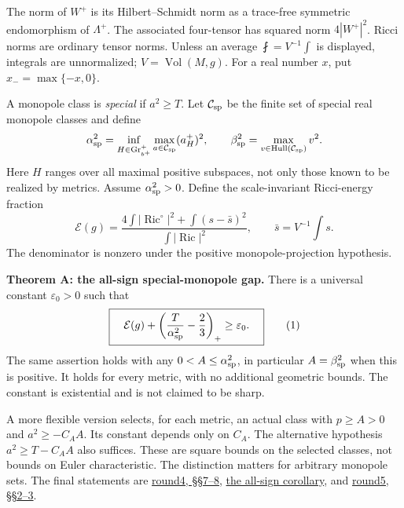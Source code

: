 \documentclass[
  english,
]{article}
\begin{document}
The norm of \(W^+\) is its Hilbert--Schmidt norm as a trace-free
symmetric endomorphism of \(\Lambda^+\). The associated four-tensor has
squared norm \(4|W^+|^2\). Ricci norms are ordinary tensor norms. Unless
an average \(\fint=V^{-1}\int\) is displayed, integrals are
unnormalized; \(V=\operatorname{Vol}(M,g)\). For a real number \(x\),
put \(x_-=\max\{-x,0\}\).

A monopole class is \emph{special} if \(a^2\ge T\). Let
\(\mathcal C_{\rm sp}\) be the finite set of special real monopole
classes and define \[
 \alpha_{\rm sp}^2=
 \inf_{H\in{\rm Gr}_{b^+}^{+}}
       \max_{a\in\mathcal C_{\rm sp}}(a_H^+)^2,\qquad
 \beta_{\rm sp}^2=
 \max_{v\in{\rm Hull}(\mathcal C_{\rm sp})}v^2 .
\] Here \(H\) ranges over all maximal positive subspaces, not only those
known to be realized by metrics. Assume \(\alpha_{\rm sp}^2>0\). Define
the scale-invariant Ricci-energy fraction \[
 \mathcal E(g)=
 \frac{4\int|\operatorname{Ric}^{\circ}|^2+
                  \int(s-\bar s)^2}{\int|\operatorname{Ric}|^2},
 \qquad \bar s=V^{-1}\int s .
\] The denominator is nonzero under the positive monopole-projection
hypothesis.

\textbf{Theorem A: the all-sign special-monopole gap.} There is a
universal constant \(\varepsilon_0>0\) such that \[
 \boxed{\quad
 \mathcal E(g)+
       \left(\frac{T}{\alpha_{\rm sp}^2}-\frac23\right)_+
       \ge\varepsilon_0 .
 \quad}                                                     \tag{1}
\] The same assertion holds with any \(0<A\le\alpha_{\rm sp}^2\), in
particular \(A=\beta_{\rm sp}^2\) when this is positive. It holds for
every metric, with no additional geometric bounds. The constant is
existential and is not claimed to be sharp.

A more flexible version selects, for each metric, an actual class with
\(p\ge A>0\) and \(a^2\ge-C_AA\). Its constant depends only on \(C_A\).
The alternative hypothesis \(a^2\ge T-C_AA\) also suffices. These are
square bounds on the selected classes, not bounds on Euler
characteristic. The distinction matters for arbitrary monopole sets. The
final statements are \href{../proofs/round4_rigidity.md}{round4,
§§7--8}, \href{../proofs/round4_all_sign_gap.md}{the all-sign
corollary}, and \href{../proofs/round5_rigidity.md}{round5, §§2--3}.
\end{document}
